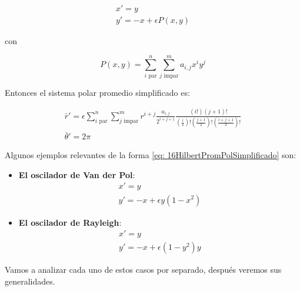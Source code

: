 \begin{equation}\label{eq: 16HilbertPromPolSimplificado}
	\begin{matrix}
		x'=y  \\
		y'= -x + \epsilon P(x,y)
	\end{matrix}
\end{equation}

con 

\[
P(x,y) = \sum_{i \text{ par}}^{n} \sum_{j \text{ impar}}^{m} a_{i,j} x^i y^j
\]

Entonces el sistema polar promedio simplificado es:

\begin{equation}\label{eq: r_promedio_simplificado}
	\begin{matrix}
		\bar{r}'=\epsilon\sum_{i \text{ par}}^{n}\sum_{j \text{ impar}}^{m}r^{i+j}\frac{a_{i,j}}{2^{i+j+1}}\frac{\left(i!\right)\left(j+1\right)!}{\left(\frac{i}{2}\right)!\left(\frac{j+1}{2}\right)!\left(\frac{i+j+1}{2}\right)!} \\
		\bar{\theta}'=2\pi
	\end{matrix}
\end{equation}

Algunos ejemplos relevantes de la forma \eqref{eq: 16HilbertPromPolSimplificado} son:

\begin{itemize}
	\item \textbf{El oscilador de Van der Pol}:
	\[
		\begin{matrix}
			x'=y \\
			y'=-x+\epsilon y(1-x^2)
		\end{matrix}
		\]
	\item \textbf{El oscilador de Rayleigh}:
	\[
		\begin{matrix}
			x'=y \\
			y'=-x+\epsilon(1-y^2)y
		\end{matrix}
	\]
\end{itemize}

Vamos a analizar cada uno de estos casos por separado, después veremos sus generalidades.

